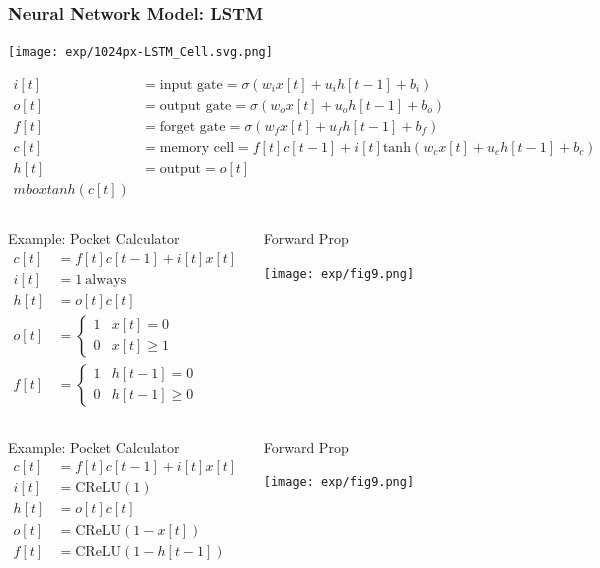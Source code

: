 \documentclass{beamer}
\begin{document}
\begin{frame}
  \frametitle{Neural Network Model: LSTM}
  \centerline{\texttt{[image: exp/1024px-LSTM\_Cell.svg.png]}}
  \begin{align*}
    i[t] &=\mbox{input gate}=\sigma(w_i x[t]+u_i h[t-1]+b_i)\\
    o[t] &=\mbox{output gate}=\sigma(w_o x[t]+u_o h[t-1]+b_o)\\
    f[t] &=\mbox{forget gate}=\sigma(w_f x[t]+u_f h[t-1]+b_f)\\
    c[t] &=\mbox{memory cell}=f[t]c[t-1]+i[t]\mbox{tanh}\left(w_cx[t]+u_ch[t-1]+b_c\right)\\
    h[t] &=\mbox{output}=o[t]\\mbox{tanh}(c[t])
  \end{align*}
\end{frame}

\begin{frame}
  \begin{columns}
    \column{2in}
    \begin{block}{Example: Pocket Calculator}
      \begin{align*}
        c[t] &=f[t]c[t-1]+i[t]x[t]\\
        i[t] &=1~\mbox{always}\\
        h[t] &=o[t]c[t]\\
        o[t] &=\begin{cases}1 & x[t]=0\\0&x[t]\ge 1\end{cases}\\
        f[t] &=\begin{cases}1 & h[t-1]=0\\0&h[t-1]\ge 0\end{cases}
      \end{align*}
    \end{block}
    \column{2.25in}
    \begin{block}{Forward Prop}
      \centerline{\texttt{[image: exp/fig9.png]}}
    \end{block}
    \end{columns}
\end{frame}

\begin{frame}
  \begin{columns}
    \column{2in}
    \begin{block}{Example: Pocket Calculator}
      \begin{align*}
        c[t] &=f[t]c[t-1]+i[t]x[t]\\
        i[t] &=\mbox{CReLU}(1)\\
        h[t] &=o[t]c[t]\\
        o[t] &=\mbox{CReLU}(1-x[t])\\
        f[t] &=\mbox{CReLU}(1-h[t-1])
      \end{align*}
    \end{block}
    \column{2.25in}
    \begin{block}{Forward Prop}
      \centerline{\texttt{[image: exp/fig9.png]}}
    \end{block}
    \end{columns}
\end{frame}
\end{document}
